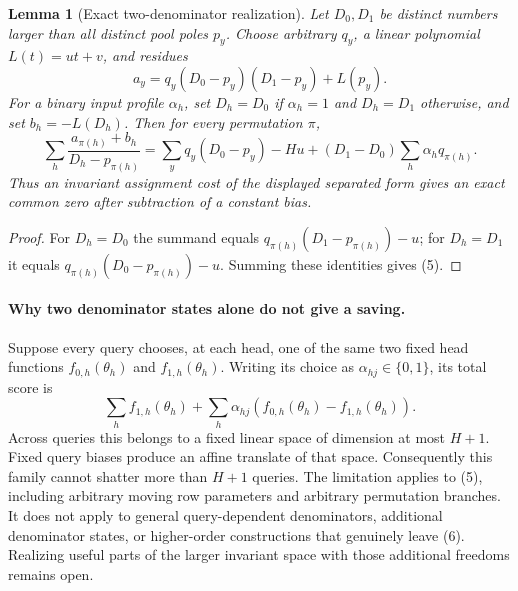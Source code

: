 \documentclass[11pt]{article}
\newtheorem{lemma}{Lemma}
\begin{document}
\begin{lemma}[Exact two-denominator realization]
Let $D_0,D_1$ be distinct numbers larger than all distinct pool poles
$p_y$. Choose arbitrary $q_y$, a linear polynomial $L(t)=ut+v$,
and residues
\[
 a_y=q_y(D_0-p_y)(D_1-p_y)+L(p_y).
\]
For a binary input profile $\alpha_h$, set $D_h=D_0$ if
$\alpha_h=1$ and $D_h=D_1$ otherwise, and set $b_h=-L(D_h)$.
Then for every permutation $\pi$,
\[
 \sum_h\frac{a_{\pi(h)}+b_h}{D_h-p_{\pi(h)}}
 =\sum_y q_y(D_0-p_y)-Hu
       +(D_1-D_0)\sum_h\alpha_hq_{\pi(h)}.             \tag{5}
\]
Thus an invariant assignment cost of the displayed separated form
gives an exact common zero after subtraction of a constant bias.
\end{lemma}
\begin{proof}
For $D_h=D_0$ the summand equals $q_{\pi(h)}(D_1-p_{\pi(h)})-u$;
for $D_h=D_1$ it equals $q_{\pi(h)}(D_0-p_{\pi(h)})-u$.
Summing these identities gives (5).
\end{proof}

\paragraph{Why two denominator states alone do not give a saving.}
Suppose every query chooses, at each head, one of the same two fixed
head functions $f_{0,h}(\theta_h)$ and $f_{1,h}(\theta_h)$.
Writing its choice as $\alpha_{hj}\in\{0,1\}$, its total score is
\[
 \sum_h f_{1,h}(\theta_h)+
       \sum_h\alpha_{hj}
           (f_{0,h}(\theta_h)-f_{1,h}(\theta_h)).       \tag{6}
\]
Across queries this belongs to a fixed linear space of dimension at
most $H+1$. Fixed query biases produce an affine translate of that
space. Consequently this family cannot shatter more than $H+1$
queries. The limitation applies to (5), including arbitrary moving
row parameters and arbitrary permutation branches. It does not apply
to general query-dependent denominators, additional denominator
states, or higher-order constructions that genuinely leave (6).
Realizing useful parts of the larger invariant space with those
additional freedoms remains open.
\end{document}
